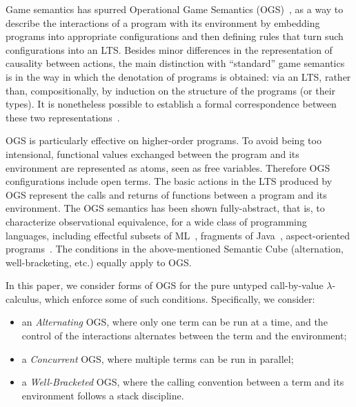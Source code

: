 Game semantics has spurred Operational Game Semantics
(OGS)~\cite{jagadeesan2009open,jeffrey2005java,laird2007,10.1016/j.entcs.2012.08.013,10.1145/2603088.2603150},
as a way to describe the interactions of a program with its 
environment by embedding  programs into appropriate configurations and then defining rules
that turn such configurations into an LTS.
Besides minor differences in the representation of causality between actions,
the main distinction with ``standard'' game semantics
is in the way in which the denotation of programs is obtained:
via an LTS, rather than, 
compositionally, by induction on the structure of the programs (or their types).
It is nonetheless possible to establish a formal correspondence between these two 
representations~\cite{10.1145/2603088.2603150}.

OGS is particularly effective on higher-order programs.
To avoid being too intensional, functional values exchanged between the program and its environment 
are represented as atoms, seen as free variables.  
Therefore OGS configurations include open terms. 
The basic actions in the LTS produced by OGS represent
the calls and returns of functions between
a program
and its environment.
The OGS semantics
has been shown  fully-abstract, that is, to characterize observational equivalence,
for a wide class of
programming languages, including effectful subsets of 
ML~\cite{laird2007,10.1145/2933575.2934509},
fragments of Java~\cite{jeffrey2005java}, aspect-oriented 
programs~\cite{jagadeesan2009open}. 
The conditions  in the above-mentioned Semantic Cube (alternation,
well-bracketing, etc.)
 equally apply to OGS.

In this paper, we consider forms of OGS
for the  pure untyped call-by-value  $\lambda$-calculus,
which enforce some of such conditions.
Specifically, we consider:
\begin{itemize}
 \item an \emph{Alternating} OGS, where only one term can be run at a time, and 
the control of the interactions alternates between the  term and the environment;
 \item a \emph{Concurrent} OGS, where multiple terms can be run in parallel;
\item a \emph{Well-Bracketed} OGS, where the calling convention between a term and its
environment follows a stack discipline.
\end{itemize}


